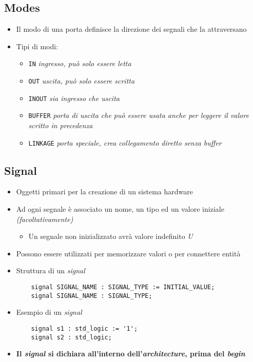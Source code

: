 \documentclass{article}
\begin{document}
\subsection{Modes}
\begin{itemize}
  \item Il modo di una porta definisce la direzione dei segnali che la attraversano
  \item Tipi di modi:
        \begin{itemize}
          \item \texttt{IN} \textit{ingresso, può solo essere letta}
          \item \texttt{OUT} \textit{uscita, può solo essere scritta}
          \item \texttt{INOUT} \textit{sia ingresso che uscita}
          \item \texttt{BUFFER} \textit{porta di uscita che può essere usata anche per leggere il valore scritto in precedenza}
          \item \texttt{LINKAGE} \textit{porta speciale, crea collegamento diretto senza buffer}
        \end{itemize}
\end{itemize}

\subsection{Signal}
\begin{itemize}
  \item Oggetti primari per la creazione di un sistema hardware
  \item Ad ogni segnale è associato un nome, un tipo ed un valore iniziale \textit{(facoltativamente)}
        \begin{itemize}
          \item Un segnale non inizializzato avrà valore indefinito \textit{U}
        \end{itemize}
  \item Possono essere utilizzati per memorizzare valori o per connettere entità
  \item Struttura di un \textit{signal}
        \begin{verbatim}
    signal SIGNAL_NAME : SIGNAL_TYPE := INITIAL_VALUE;
    signal SIGNAL_NAME : SIGNAL_TYPE;
	      \end{verbatim}
  \item Esempio di un \textit{signal}
        \begin{verbatim}
    signal s1 : std_logic := '1';
    signal s2 : std_logic;
	      \end{verbatim}
  \item \textbf{Il \textit{signal} si dichiara all'interno dell'\textit{architecture}, prima del \textit{begin}}
\end{itemize}
\end{document}
